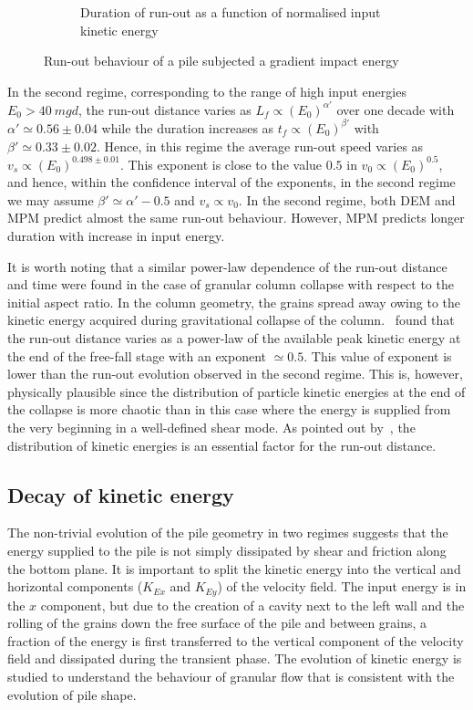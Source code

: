 \begin{figure}[tbph]
\begin{subfigure}[b]{0.975\textwidth}
\caption{Duration of run-out as a function of normalised input kinetic energy}
\label{fig:Tf_vs_Eo_Slope}
\end{subfigure}
\caption{Run-out behaviour of a pile subjected a gradient impact energy}
\label{fig:Slope}
\end{figure}

In the second regime, corresponding to the range of high input energies  $E_0 > 
40 \ mgd$, the run-out distance varies as $L_f \propto (E_0)^{\alpha'}$ over 
one decade with $\alpha' \simeq 0.56\pm 0.04$ while the duration increases as 
$t_f \propto (E_0)^{\beta'}$ with $\beta' \simeq 0.33 \pm 0.02$. Hence, in this 
regime the average run-out speed varies as $v_s \propto (E_0)^{0.498 \pm 
0.01}$. This exponent is close to the value $0.5$ in $v_0 \propto (E_0)^{0.5}$, 
and hence, within the confidence interval of the exponents, in the second 
regime we may assume $\beta' \simeq \alpha' - 0.5$ and $v_s \propto v_0$. In 
the second regime, both DEM and MPM predict almost the same run-out behaviour. 
However, MPM predicts longer duration with increase in input energy.

It is worth noting that a similar power-law dependence of the run-out distance 
and time were found in the case of granular column collapse with respect to 
the initial aspect ratio. In the column geometry, the grains spread away 
owing to the kinetic energy acquired during gravitational collapse of the 
column.~\citet{Topin2012} found that the run-out distance varies as a power-law 
of the available peak kinetic energy at the end of the free-fall stage with an 
exponent $\simeq 0.5$. This value of exponent is lower than the run-out 
evolution observed in the second regime. This is, however, physically plausible 
since the distribution of particle kinetic energies at the end of the collapse 
is more chaotic than in this case where the energy is supplied from the very 
beginning in a well-defined shear mode. As pointed out by~\citet{Staron2005}, 
the distribution of kinetic energies is an essential factor for the run-out 
distance.

\subsection{Decay of kinetic energy}
\label{sec:decay}

The non-trivial evolution of the pile geometry in two regimes suggests that 
the energy supplied to the pile is not simply dissipated by shear and friction 
along the bottom plane. It is important to split the kinetic energy into the 
vertical and horizontal components ($K_{Ex}$ and $K_{Ey}$) of the velocity 
field. The input energy is in the $x$ component, but due to the creation 
of a cavity next  to the left wall and the rolling of the grains down the free 
surface of the pile and between grains, a fraction of the energy is first 
transferred to the vertical component of the velocity field and dissipated  
during the transient phase. The evolution of kinetic energy is studied to  
understand the behaviour of granular flow that is consistent with the evolution 
of pile shape.

